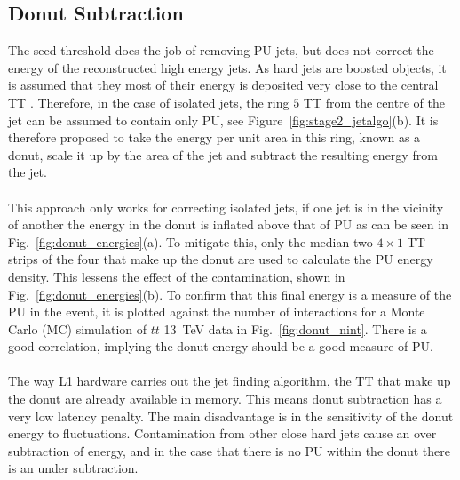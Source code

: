\subsection{Donut Subtraction}
The seed threshold does the job of removing PU jets, but does not correct the energy of the reconstructed high energy jets. As hard jets are boosted objects, it is assumed that they most of their energy is deposited very close to the central TT \cite{JetProfile_pileup}. Therefore, in the case of isolated jets, the ring $5$ TT from the centre of the jet can be assumed to contain only PU, see Figure~\ref{fig:stage2_jetalgo}(b). It is therefore proposed to take the energy per unit area in this ring, known as a donut, scale it up by the area of the jet and subtract the resulting energy from the jet. 
\\\\
This approach only works for correcting isolated jets, if one jet is in the vicinity of another the energy in the donut is inflated above that of PU as can be seen in Fig.~\ref{fig:donut_energies}(a). To mitigate this, only the median two $4\times1$ TT strips of the four that make up the donut are used to calculate the PU energy density. This lessens the effect of the contamination, shown in Fig.~\ref{fig:donut_energies}(b). To confirm that this final energy is a measure of the PU in the event, it is plotted against the number of interactions for a Monte Carlo (MC) simulation of $t\bar{t}$ 13~TeV data in Fig.~\ref{fig:donut_nint}. There is a good correlation, implying the donut energy should be a good measure of PU.
\\\\
\noindent The way L1 hardware carries out the jet finding algorithm, the TT that make up the donut are already available in memory. This means donut subtraction has a very low latency penalty. The main disadvantage is in the sensitivity of the donut energy to fluctuations. Contamination from other close hard jets cause an over subtraction of energy, and in the case that there is no PU within the donut there is an under subtraction. 



